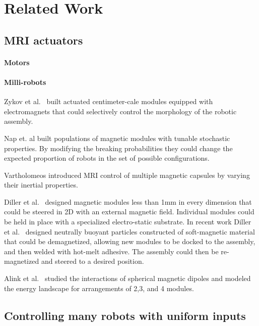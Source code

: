 

\section{Related Work}\label{sec:RelatedWork}


\subsection{MRI actuators}

\paragraph{Motors}

\paragraph{Milli-robots}


Zykov et al.~\cite{Zykov2007} built actuated centimeter-cale modules equipped with electromagnets that could selectively control the morphology of the robotic assembly.  


Nap et. al  \cite{Klavins-RSS-06} built populations of magnetic modules with tunable stochastic properties.  By modifying the breaking probabilities they could change the expected proportion of robots in the set of possible configurations.


Vartholomeos \cite{Vartholomeos2012} introduced MRI control of multiple magnetic capsules by varying their inertial properties.  

Diller et al.~\cite{Diller01122011} designed magnetic modules less than 1mm in every dimension that could be steered in 2D with an external magnetic field.  Individual modules could be held in place with a specialized electro-static substrate. 
 In recent work Diller et al.~\cite{diller2013modular} designed neutrally buoyant particles constructed of soft-magnetic material that could be demagnetized, allowing new modules to be docked to the assembly, and then welded with hot-melt adhesive.  The assembly could then be re-magnetized and steered to a desired position.
 
 
 
Alink et al.~\cite{eemcs21309} studied the interactions of spherical magnetic dipoles and modeled the energy landscape for arrangements of 2,3, and 4 modules.  



\subsection{Controlling many robots with uniform inputs}